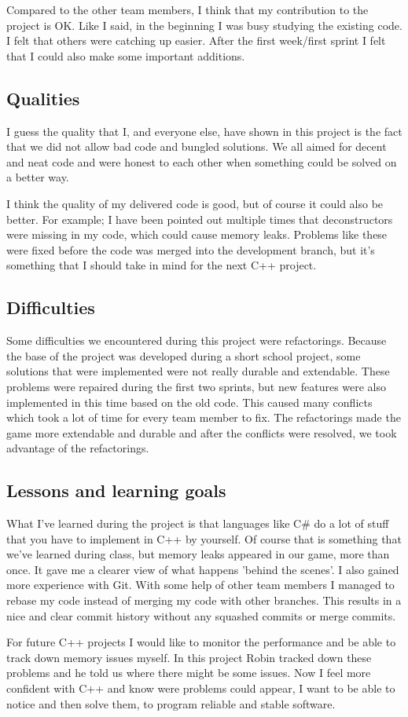 Compared to the other team members, I think that my contribution to the project is OK. Like I said, in the beginning I was busy studying the existing code. I felt that others were catching up easier. After the first week/first sprint I felt that I could also make some important additions.

\subsection{Qualities}
I guess the quality that I, and everyone else, have shown in this project is the fact that we did not allow bad code and bungled solutions. We all aimed for decent and neat code and were honest to each other when something could be solved on a better way.

I think the quality of my delivered code is good, but of course it could also be better. For example; I have been pointed out multiple times that deconstructors were missing in my code, which could cause memory leaks. Problems like these were fixed before the code was merged into the development branch, but it's something that I should take in mind for the next C++ project.

\subsection{Difficulties}
Some difficulties we encountered during this project were refactorings. Because the base of the project was developed during a short school project, some solutions that were implemented were not really durable and extendable. These problems were repaired during the first two sprints, but new features were also implemented in this time based on the old code. This caused many conflicts which took a lot of time for every team member to fix. The refactorings made the game more extendable and durable and after the conflicts were resolved, we took advantage of the refactorings.

\subsection{Lessons and learning goals}		
What I've learned during the project is that languages like C\# do a lot of stuff that you have to implement in C++ by yourself. Of course that is something that we've learned during class, but memory leaks appeared in our game, more than once. 
It gave me a clearer view of what happens 'behind the scenes'.
I also gained more experience with Git. With some help of other team members I managed to rebase my code instead of merging my code with other branches. This results in a nice and clear commit history without any squashed commits or merge commits.

For future C++ projects I would like to monitor the performance and be able to track down memory issues myself. In this project Robin tracked down these problems and he told us where there might be some issues. Now I feel more confident with C++ and know were problems could appear, I want to be able to notice and then solve them, to program reliable and stable software. 

